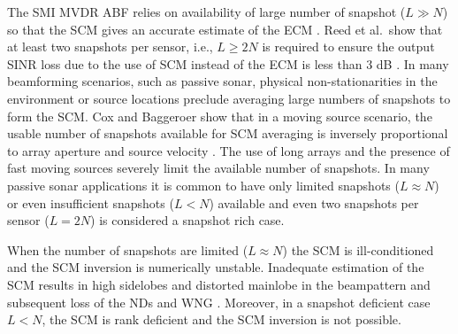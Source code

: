 The SMI MVDR ABF relies on availability of large number of snapshot
(${L \gg N}$) so that the SCM gives an accurate estimate of the ECM
\cite{boroson1980sample}. Reed et al.\ show that at least two
snapshots per sensor, i.e., $L \geq 2N$ is required to ensure the
output SINR loss due to the use of SCM instead of the ECM is less than
$3$ dB \cite{reed1974rapid}. In many beamforming scenarios, such as
passive sonar, physical non-stationarities in the environment or
source locations preclude averaging large numbers of snapshots to form
the SCM. Cox and Baggeroer show that in a moving source scenario, the
usable number of snapshots available for SCM averaging is inversely
proportional to array aperture and source velocity
\cite{baggeroer1999passive, cox2000mrabf}. The use of long arrays and
the presence of fast moving sources severely limit the available
number of snapshots. In many passive sonar applications it is common
to have only limited snapshots ($L \approx N$) or even insufficient
snapshots ($L < N$) available and even two snapshots per sensor
($L = 2N$) is considered a snapshot rich case.

When the number of snapshots are limited ($L \approx N$) the SCM is
ill-conditioned and the SCM inversion is numerically
unstable. Inadequate estimation of the SCM results in high sidelobes
and distorted mainlobe in the beampattern and subsequent loss of the
NDs and WNG \cite{Carlson1988scm, richmond2000mvdr}. Moreover, in a
snapshot deficient case $L < N$, the SCM is rank deficient and the SCM
inversion is not possible.


